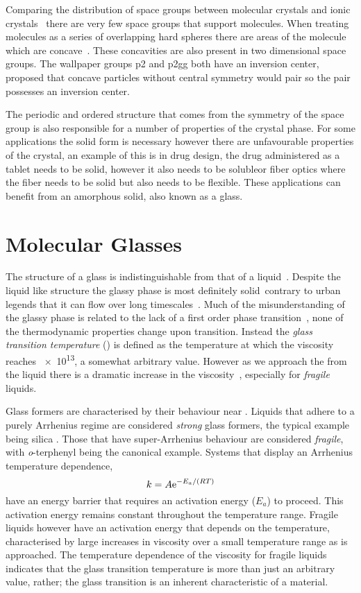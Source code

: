 Comparing the distribution of space groups between molecular crystals and ionic crystals~\figref{} there are very few space groups that support molecules. When treating molecules as a series of overlapping hard spheres there are areas of the molecule which are concave~\figref{}. These concavities are also present in two dimensional space groups. The wallpaper groups p2 and p2gg both have an inversion center, \tocite proposed that concave particles without central symmetry would pair so the pair possesses an inversion center.

The periodic and ordered structure that comes from the symmetry of the space group is also responsible for a number of properties of the crystal phase. 
For some applications the solid form is necessary however there are unfavourable properties of the crystal, an example of this is in drug design, the drug administered as a tablet needs to be solid, however it also needs to be soluble\tocite or fiber optics where the fiber needs to be solid but also needs to be flexible\tocite. These applications can benefit from an amorphous solid, also known as a glass.

\section{Molecular Glasses}

The structure of a glass is indistinguishable from that of a liquid~\figref{}. Despite the liquid like structure the glassy phase is most definitely solid~\tocite contrary to urban legends that it can flow over long timescales~\tocite. Much of the misunderstanding of the glassy phase is related to the lack of a first order phase transition~\tocite, none of the thermodynamic properties change upon transition. Instead the \emph{glass transition temperature} (\si{\Tg}) is defined as the temperature at which the viscosity reaches \SI{e13}{\poise}, a somewhat arbitrary value. However as we approach the \si{\Tg} from the liquid there is a dramatic increase in the viscosity~\figref{}, especially for \emph{fragile} liquids.

Glass formers are characterised by their behaviour near \si{\Tg}. Liquids that adhere to a purely Arrhenius regime are considered \emph{strong} glass formers, the typical example being silica . Those that have super-Arrhenius behaviour are considered \emph{fragile}, with \emph{o}-terphenyl being the canonical example. Systems that display an Arrhenius temperature dependence,
\begin{equation}
    k = A \text{e}^{-E_a/(RT)}
\end{equation}
have an energy barrier that requires an activation energy ($E_a$) to proceed. This activation energy remains constant throughout the temperature range. Fragile liquids however have an activation energy that depends on the temperature\tocite, characterised by large increases in viscosity over a small temperature range as \si{\Tg} is approached. The temperature dependence of the viscosity for fragile liquids indicates that the glass transition temperature is more than just an arbitrary value, rather; the glass transition is an inherent characteristic of a material.

